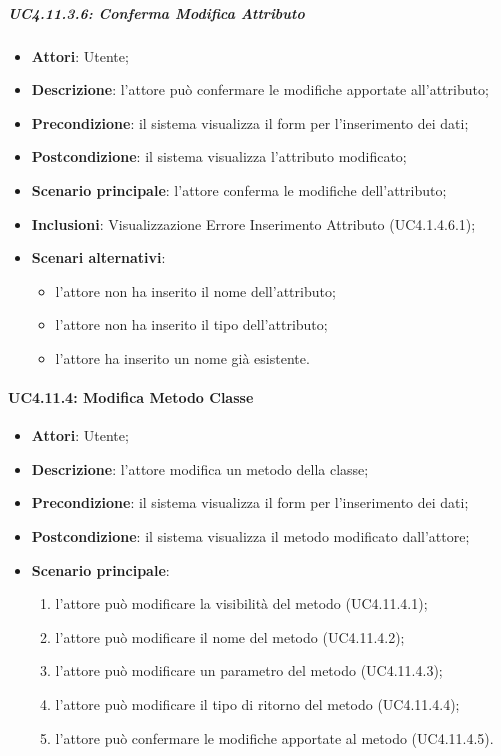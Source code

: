 \subparagraph{UC4.11.3.6: Conferma Modifica Attributo}
\label{UC4.11.3.6}
\begin{itemize}
\item \textbf{Attori}: Utente;
\item \textbf{Descrizione}: l'attore può confermare le modifiche apportate all'attributo;	
\item \textbf{Precondizione}: il sistema visualizza il form per l'inserimento dei dati;	
\item \textbf{Postcondizione}: il sistema visualizza l'attributo modificato;	
\item \textbf{Scenario principale}:
l'attore conferma le modifiche dell'attributo;	
\item \textbf{Inclusioni}:
Visualizzazione Errore Inserimento Attributo (UC4.1.4.6.1);
\item \textbf{Scenari alternativi}:
\begin{itemize}
\item l'attore non ha inserito il nome dell'attributo;
\item l'attore non ha inserito il tipo dell'attributo;
\item l'attore ha inserito un nome già esistente.
\end{itemize}
\end{itemize}

\paragraph{UC4.11.4: Modifica Metodo Classe}
\label{UC4.11.4}
\begin{itemize}
\item \textbf{Attori}: Utente;
\item \textbf{Descrizione}: l'attore modifica un metodo della classe;	
\item \textbf{Precondizione}: il sistema visualizza il form per l'inserimento dei dati;	
\item \textbf{Postcondizione}: il sistema visualizza il metodo modificato dall'attore;	
\item \textbf{Scenario principale}:
\begin{enumerate}
\item l'attore può modificare la visibilità del metodo (UC4.11.4.1);
\item l'attore può modificare il nome del metodo (UC4.11.4.2);
\item l'attore può modificare un parametro del metodo (UC4.11.4.3);
\item l'attore può modificare il tipo di ritorno del metodo (UC4.11.4.4);
\item l'attore può confermare le modifiche apportate al metodo (UC4.11.4.5).
\end{enumerate}
\end{itemize}

